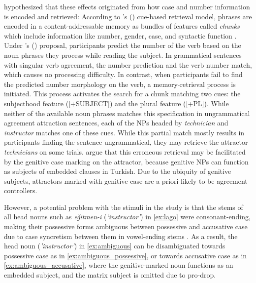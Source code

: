 \documentclass[apacite,linguex]{glossa}\usepackage[]{graphicx}\usepackage[]{color}
\begin{document}
\citet{LagoEtAl:2019} hypothesized that these effects originated from how case and number information is encoded and retrieved: According to \citeauthor{LewisVasishth:2005}'s (\citeyear{LewisVasishth:2005}) cue-based retrieval model, phrases are encoded in a content-addressable memory as bundles of features called \textit{chunks} which include information like number, gender, case, and syntactic function \citep[e.g.,][]{SmithVasishth:2020}. Under \citeauthor{LagoEtAl:2019}'s (\citeyear{LagoEtAl:2019}) proposal, participants predict the number of the verb based on the noun phrases they process while reading the subject. In grammatical sentences with singular verb agreement, the number prediction and the verb number match, which causes no processing difficulty. In contrast, when participants fail to find the predicted number morphology on the verb, a memory-retrieval process is initiated. This process activates the search for a chunk matching two cues: the subjecthood feature ([+SUBJECT]) and the plural feature ([+PL]). While neither of the available noun phrases matches this specification in ungrammatical agreement attraction sentences, each of the NPs headed by \textit{technician} and \textit{instructor} matches one of these cues. While this partial match mostly results in participants finding the sentence ungrammatical, they may retrieve the attractor \textit{technicians} on some trials. \citet{LagoEtAl:2019} argue that this erroneous retrieval may be facilitated by the genitive case marking on the attractor, because genitive NPs can function as subjects of embedded clauses in Turkish. Due to the ubiquity of genitive subjects, attractors marked with genitive case are a priori likely to be agreement controllers.

However, a potential problem with the stimuli in the \citet{LagoEtAl:2019} study is that the stems of all head nouns such as \textit{e\u{g}itmen-i} (\textit{`instructor'}) in \ref{ex:lago} were consonant-ending, making their possessive forms ambiguous between possessive and accusative case due to case syncretism between them in vowel-ending stems \citep[pp. 66--67]{GokselKerslake:2005}.
As a result, the head noun (\textit{'instructor'}) in \ref{ex:ambiguous} can be disambiguated towards possessive case as in \ref{ex:ambiguous_possessive}, or towards accusative case as in \ref{ex:ambiguous_accusative}, where the genitive-marked noun functions as an embedded subject, and the matrix subject is omitted due to pro-drop.
\end{document}

